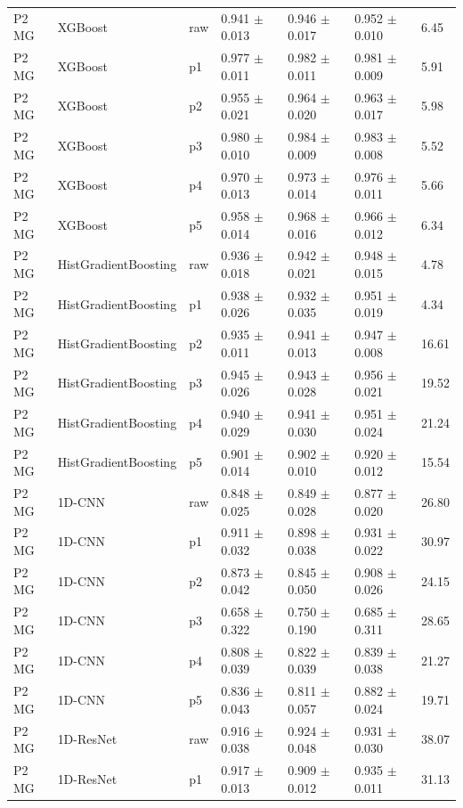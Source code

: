 {\begin{longtable}{L{2.35cm}L{2.4cm}L{1.0cm}L{2.35cm}L{2.25cm}L{2.25cm}L{1.45cm}}
P2 MG & XGBoost & raw & 0.941 $\pm$ 0.013 & 0.946 $\pm$ 0.017 & 0.952 $\pm$ 0.010 & 6.45 \\
P2 MG & XGBoost & p1 & 0.977 $\pm$ 0.011 & 0.982 $\pm$ 0.011 & 0.981 $\pm$ 0.009 & 5.91 \\
P2 MG & XGBoost & p2 & 0.955 $\pm$ 0.021 & 0.964 $\pm$ 0.020 & 0.963 $\pm$ 0.017 & 5.98 \\
P2 MG & XGBoost & p3 & 0.980 $\pm$ 0.010 & 0.984 $\pm$ 0.009 & 0.983 $\pm$ 0.008 & 5.52 \\
P2 MG & XGBoost & p4 & 0.970 $\pm$ 0.013 & 0.973 $\pm$ 0.014 & 0.976 $\pm$ 0.011 & 5.66 \\
P2 MG & XGBoost & p5 & 0.958 $\pm$ 0.014 & 0.968 $\pm$ 0.016 & 0.966 $\pm$ 0.012 & 6.34 \\
P2 MG & HistGradientBoosting & raw & 0.936 $\pm$ 0.018 & 0.942 $\pm$ 0.021 & 0.948 $\pm$ 0.015 & 4.78 \\
P2 MG & HistGradientBoosting & p1 & 0.938 $\pm$ 0.026 & 0.932 $\pm$ 0.035 & 0.951 $\pm$ 0.019 & 4.34 \\
P2 MG & HistGradientBoosting & p2 & 0.935 $\pm$ 0.011 & 0.941 $\pm$ 0.013 & 0.947 $\pm$ 0.008 & 16.61 \\
P2 MG & HistGradientBoosting & p3 & 0.945 $\pm$ 0.026 & 0.943 $\pm$ 0.028 & 0.956 $\pm$ 0.021 & 19.52 \\
P2 MG & HistGradientBoosting & p4 & 0.940 $\pm$ 0.029 & 0.941 $\pm$ 0.030 & 0.951 $\pm$ 0.024 & 21.24 \\
P2 MG & HistGradientBoosting & p5 & 0.901 $\pm$ 0.014 & 0.902 $\pm$ 0.010 & 0.920 $\pm$ 0.012 & 15.54 \\
P2 MG & 1D-CNN & raw & 0.848 $\pm$ 0.025 & 0.849 $\pm$ 0.028 & 0.877 $\pm$ 0.020 & 26.80 \\
P2 MG & 1D-CNN & p1 & 0.911 $\pm$ 0.032 & 0.898 $\pm$ 0.038 & 0.931 $\pm$ 0.022 & 30.97 \\
P2 MG & 1D-CNN & p2 & 0.873 $\pm$ 0.042 & 0.845 $\pm$ 0.050 & 0.908 $\pm$ 0.026 & 24.15 \\
P2 MG & 1D-CNN & p3 & 0.658 $\pm$ 0.322 & 0.750 $\pm$ 0.190 & 0.685 $\pm$ 0.311 & 28.65 \\
P2 MG & 1D-CNN & p4 & 0.808 $\pm$ 0.039 & 0.822 $\pm$ 0.039 & 0.839 $\pm$ 0.038 & 21.27 \\
P2 MG & 1D-CNN & p5 & 0.836 $\pm$ 0.043 & 0.811 $\pm$ 0.057 & 0.882 $\pm$ 0.024 & 19.71 \\
P2 MG & 1D-ResNet & raw & 0.916 $\pm$ 0.038 & 0.924 $\pm$ 0.048 & 0.931 $\pm$ 0.030 & 38.07 \\
P2 MG & 1D-ResNet & p1 & 0.917 $\pm$ 0.013 & 0.909 $\pm$ 0.012 & 0.935 $\pm$ 0.011 & 31.13 \\

\end{longtable}}
